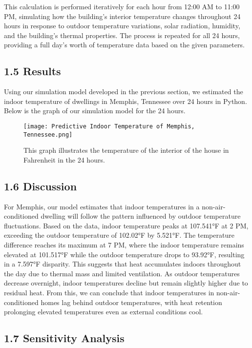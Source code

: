 \documentclass{article}
\begin{document}
This calculation is performed iteratively for each hour from 12:00 AM to 11:00 PM, simulating how the building's interior temperature changes throughout 24 hours in response to outdoor temperature variations, solar radiation, humidity, and the building’s thermal properties. The process is repeated for all 24 hours, providing a full day’s worth of temperature data based on the given parameters.

\subsection*{1.5 Results}

Using our simulation model developed in the previous section, we estimated the indoor temperature of dwellings in Memphis, Tennessee over 24 hours in Python. Below is the graph of our simulation model for the 24 hours.
\begin{figure}[h]
    \label{fig:Predictive Indoor Temperature of Memphis, Tennessee}
    \centering
    \texttt{[image: Predictive Indoor Temperature of Memphis, Tennessee.png]}
    \vskip 10pt
    \parbox{0.5\linewidth}{This graph illustrates the temperature of the interior of the house in Fahrenheit in the 24 hours.}
    
\end{figure}

\subsection*{1.6 Discussion}

For Memphis, our model estimates that indoor temperatures in a non-air-conditioned dwelling will follow the pattern influenced by outdoor temperature fluctuations. Based on the data, indoor temperature peaks at 107.541°F at 2 PM, exceeding the outdoor temperature of 102.02°F by 5.521°F. The temperature difference reaches its maximum at 7 PM, where the indoor temperature remains elevated at 101.517°F while the outdoor temperature drops to 93.92°F, resulting in a 7.597°F disparity. This suggests that heat accumulates indoors throughout the day due to thermal mass and limited ventilation. As outdoor temperatures decrease overnight, indoor temperatures decline but remain slightly higher due to residual heat. From this, we can conclude that indoor temperatures in non-air-conditioned homes lag behind outdoor temperatures, with heat retention prolonging elevated temperatures even as external conditions cool.

\subsection*{1.7 Sensitivity Analysis}
\end{document}
